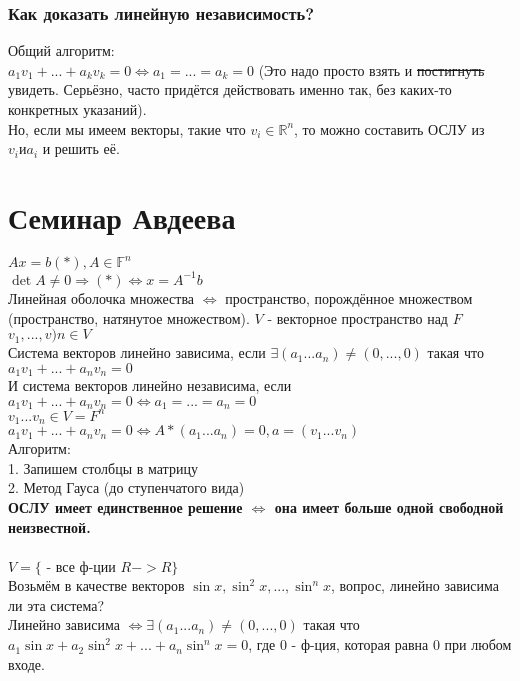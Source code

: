 \documentclass[a4paper,11pt]{report}
\begin{document}
\subsection{Как доказать линейную независимость?}
Общий алгоритм:\\
$a_1v_1 + ... +a_kv_k = 0 \Leftrightarrow a_1 = ... = a_k = 0$ (Это надо просто взять и \sout{постигнуть} увидеть. 
Серьёзно, часто придётся действовать именно так, без каких-то конкретных указаний).\\
Но, если мы имеем векторы, такие что $v_i \in \mathbb{R}^n$,
то можно составить ОСЛУ из $v_i и a_i$ и решить её.
\chapter{Семинар Авдеева}
$Ax = b (*), A \in \mathbb{F}^n$\\
$\det{A} \neq 0 \Rightarrow (*) \Leftrightarrow x = A^{-1}b$\\
Линейная оболочка множества $\Leftrightarrow$ пространство, порождённое множеством (пространство, натянутое множеством).
$V$ - векторное пространство над $F$\\
$v_1, ..., v)n \in V$\\
Система векторов линейно зависима, если $\exists (a_1 ... a_n) \neq (0, ..., 0)$ такая что $a_1v_1 + ... + a_nv_n = 0$\\
И система векторов линейно независима, если $a_1v_1 + ... + a_nv_n = 0 \Leftrightarrow a_1 =  ... = a_n = 0$\\
$v_1 ... v_n \in V = F^n$\\
$a_1v_1 + ... + a_nv_n  = 0 \Leftrightarrow A*(a_1 ... a_n) = 0, a = (v_1 ... v_n)$\\
Алгоритм:\\
1. Запишем столбцы в матрицу\\
2. Метод Гауса (до ступенчатого вида)\\
\textbf{ОСЛУ имеет единственное решение $\Leftrightarrow$ она имеет больше одной свободной неизвестной.}\\
\\
$V=\{$ - все ф-ции $R -> R\}$\\
Возьмём в качестве векторов $\sin{x}, \sin^2{x}, ..., \sin^n{x}$, вопрос, линейно зависима ли эта система?\\
Линейно зависима $\Leftrightarrow \exists (a_1 ... a_n) \neq (0, ..., 0)$ такая что $a_1\sin{x} + a_2\sin^2{x} + ... + a_n\sin^n{x} = 0$, 
где $0$ - ф-ция, которая равна $0$ при любом входе.\\
\end{document}
